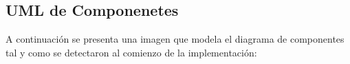 \documentclass[10pt]{article} %
\begin{document}
\begin{figure}[H] %
\label{fig:DiagramaDeDespliegue_Pre}
\end{figure}

\subsection{UML de Componenetes}
A continuación se presenta una imagen que modela el diagrama de componentes tal y como se detectaron al comienzo de la implementación:

\begin{figure}[H] %
\label{fig:DiagramaDeComponentes_Pre}
\end{figure}
\end{document}
